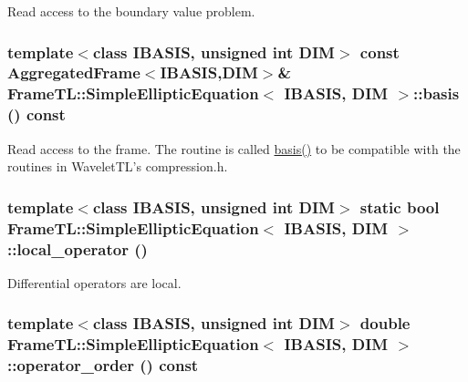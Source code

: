 Read access to the boundary value problem. \hypertarget{classFrameTL_1_1SimpleEllipticEquation_b0d14a3117004cec09cca7b665c962d0}{
\subsubsection[basis]{\setlength{\rightskip}{0pt plus 5cm}template$<$class IBASIS, unsigned int DIM$>$ const {\bf AggregatedFrame}$<$IBASIS,DIM$>$\& {\bf FrameTL::SimpleEllipticEquation}$<$ IBASIS, DIM $>$::basis () const}}
\label{classFrameTL_1_1SimpleEllipticEquation_b0d14a3117004cec09cca7b665c962d0}


Read access to the frame. The routine is called \hyperlink{classFrameTL_1_1SimpleEllipticEquation_b0d14a3117004cec09cca7b665c962d0}{basis()} to be compatible with the routines in WaveletTL's compression.h. \hypertarget{classFrameTL_1_1SimpleEllipticEquation_cd41f35521f8ac7af05fd0294cbf76ef}{
\subsubsection[local\_\-operator]{\setlength{\rightskip}{0pt plus 5cm}template$<$class IBASIS, unsigned int DIM$>$ static bool {\bf FrameTL::SimpleEllipticEquation}$<$ IBASIS, DIM $>$::local\_\-operator ()}}
\label{classFrameTL_1_1SimpleEllipticEquation_cd41f35521f8ac7af05fd0294cbf76ef}


Differential operators are local. \hypertarget{classFrameTL_1_1SimpleEllipticEquation_b630525bc26c31fd7fd241c2d31fd4c8}{
\subsubsection[operator\_\-order]{\setlength{\rightskip}{0pt plus 5cm}template$<$class IBASIS, unsigned int DIM$>$ double {\bf FrameTL::SimpleEllipticEquation}$<$ IBASIS, DIM $>$::operator\_\-order () const}}
\label{classFrameTL_1_1SimpleEllipticEquation_b630525bc26c31fd7fd241c2d31fd4c8}



